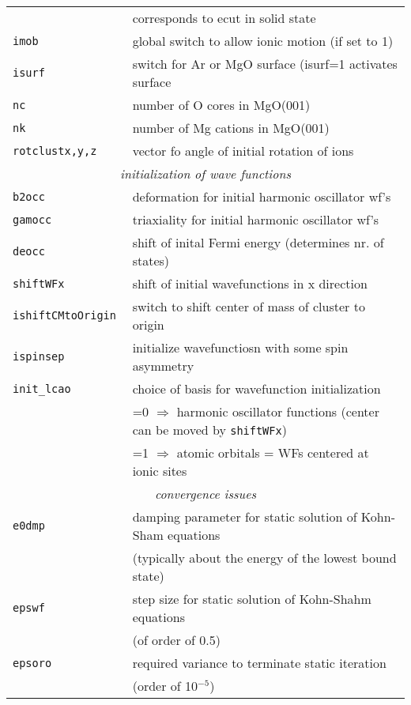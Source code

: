\documentclass[12pt]{article}
\begin{document}
\begin{enumerate}
\begin{tabular}{ll}
&corresponds to ecut in solid state\\
{\tt imob          }& global switch to allow ionic motion (if set to 1) \\
{\tt isurf            }& switch for Ar or MgO surface (isurf=1 activates
          surface\\
{\tt nc               }& number of O cores in MgO(001)\\
{\tt nk               }& number of Mg cations in MgO(001)\\
{\tt rotclustx,y,z } & vector fo angle of initial rotation of ions\\
\hline
\multicolumn{2}{c}{\it initialization of wave functions} \\
\hline
{\tt b2occ            }& deformation for initial harmonic oscillator wf's\\
{\tt gamocc           }& triaxiality for initial harmonic oscillator wf's\\
{\tt deocc            }& shift of inital Fermi energy (determines nr. of
states)\\
{\tt shiftWFx         }& shift of initial wavefunctions in x direction \\
{\tt ishiftCMtoOrigin }& switch to shift center of mass of cluster to origin\\
{\tt ispinsep         }& initialize wavefunctiosn with some spin asymmetry\\
{\tt init\_lcao       }& choice of basis for wavefunction initialization \\
& =0 $\Longrightarrow$ harmonic oscillator functions (center can be
moved
  by {\tt shiftWFx})
\\
& =1 $\Longrightarrow$ atomic orbitals = WFs centered at ionic sites
\\
\hline
\multicolumn{2}{c}{\it convergence issues} \\
\hline
{\tt e0dmp            }& damping parameter for static solution of Kohn-Sham equations\\
& (typically about the energy of the lowest bound state)\\
{\tt epswf            }& step size for static solution of Kohn-Shahm
equations\\
& (of order of 0.5)\\
{\tt epsoro           }& required variance to terminate static iteration\\
&(order of 10$^{-5}$)\\
\hline
\end{tabular}


\end{enumerate}
\end{document}
